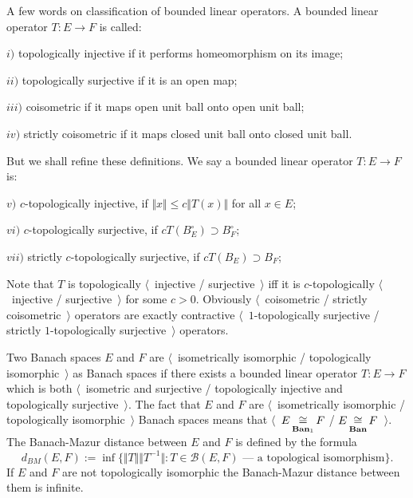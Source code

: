 A few words on classification of bounded linear operators. A bounded linear operator $T:E\to F$ is called:

$i)$ topologically injective if it performs homeomorphism on its image;

$ii)$ topologically surjective if it is an open map;

$iii)$ coisometric if it maps open unit ball onto open unit ball;

$iv)$ strictly coisometric if it maps closed unit ball onto closed unit ball. 

But we shall refine these definitions. We say a bounded linear operator $T:E\to F$ is:

$v)$ $c$-topologically injective, if $\Vert x\Vert\leq c\Vert  T(x)\Vert$ for all $x\in E$;

$vi)$ $c$-topologically surjective, if $cT(B_E^\circ)\supset B_F^\circ$;

$vii)$ strictly $c$-topologically surjective, if $cT(B_E)\supset B_F$; 

Note that $T$ is topologically $\langle$~injective / surjective~$\rangle$ iff it is $c$-topologically $\langle$~injective / surjective~$\rangle$ for some $c>0$. Obviously $\langle$~coisometric / strictly coisometric~$\rangle$ operators are exactly contractive $\langle$~$1$-topologically surjective / strictly $1$-topologically surjective~$\rangle$ operators.

Two Banach spaces $E$ and $F$ are $\langle$~isometrically isomorphic / topologically isomorphic~$\rangle$ as Banach spaces if there exists a bounded linear operator $T:E\to F$ which is both $\langle$~isometric and surjective / topologically injective and topologically surjective~$\rangle$. The fact that $E$ and $F$ are $\langle$~isometrically isomorphic / topologically isomorphic~$\rangle$ Banach spaces means that $\langle$~$E\mathop{\mathbin{\cong}}\limits_{\mathbf{Ban}_1}F$ / $E\mathop{\mathbin{\cong}}\limits_{\mathbf{Ban}}F$~$\rangle$. The Banach-Mazur distance between $E$ and $F$ is defined by the formula 
$$
d_{BM}(E,F):=\inf\{\Vert T\Vert\Vert T^{-1}\Vert: T \in \mathcal{B}(E,F) \mbox{ --- a topological isomorphism}\}.
$$ 
If $E$ and $F$ are not topologically isomorphic the Banach-Mazur distance between them is infinite.

